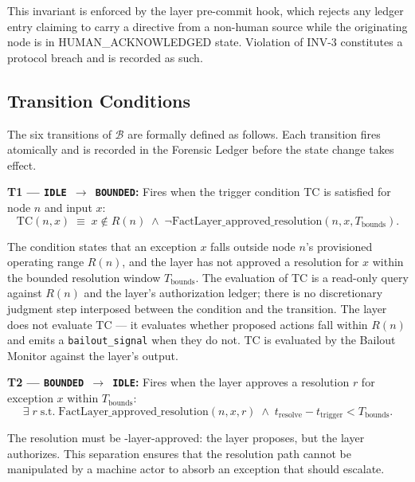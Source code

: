 This invariant is enforced by the \fact{} layer pre-commit hook, which rejects any ledger entry claiming to carry a directive from a non-human source while the originating node is in HUMAN\_ACKNOWLEDGED state. Violation of INV-3 constitutes a protocol breach and is recorded as such.

\subsection{Transition Conditions}\label{sec:transitions}

The six transitions of $\mathcal{B}$ are formally defined as follows. Each transition fires atomically and is recorded in the Forensic Ledger before the state change takes effect.

\bigskip
\noindent\textbf{T1 --- \texttt{IDLE $\rightarrow$ BOUNDED}:} Fires when the trigger condition TC is satisfied for node $n$ and input $x$:
\begin{equation}
\text{TC}(n, x) \;\equiv\; x \notin R(n) \;\land\; \neg\text{FactLayer\_approved\_resolution}(n, x, T_{\text{bounds}}). \tag{TC}
\end{equation}

The condition states that an exception $x$ falls outside node $n$'s provisioned operating range $R(n)$, and the \fact{} layer has not approved a resolution for $x$ within the bounded resolution window $T_{\text{bounds}}$. The evaluation of TC is a read-only query against $R(n)$ and the \fact{} layer's authorization ledger; there is no discretionary judgment step interposed between the condition and the transition. The \bounds{} layer does not evaluate TC --- it evaluates whether proposed actions fall within $R(n)$ and emits a \texttt{bailout\_signal} when they do not. TC is evaluated by the Bailout Monitor against the \bounds{} layer's output.

\bigskip
\noindent\textbf{T2 --- \texttt{BOUNDED $\rightarrow$ IDLE}:} Fires when the \fact{} layer approves a resolution $r$ for exception $x$ within $T_{\text{bounds}}$:
\begin{equation}
\exists\; r \;\text{s.t.}\; \text{FactLayer\_approved\_resolution}(n, x, r) \;\land\; t_{\text{resolve}} - t_{\text{trigger}} < T_{\text{bounds}}. \tag{T2}
\end{equation}

The resolution must be \fact-layer-approved: the \bounds{} layer proposes, but the \fact{} layer authorizes. This separation ensures that the resolution path cannot be manipulated by a machine actor to absorb an exception that should escalate.

